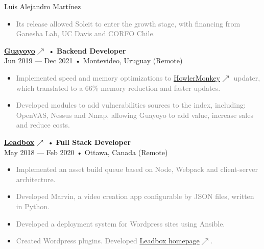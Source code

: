 \documentclass[12pt]{article}
\begin{document}
\begin{cv}{Luis Alejandro Mart\'inez}
\begin{minipage}[t]{0.55\textwidth}
{{\begin{itemize}
          \item \textcolor{gray}{Its release allowed Soleit to enter the growth stage, with financing from Ganesha Lab, UC Davis and CORFO Chile.}
        \end{itemize}
      }
    }\vspace{0.125em}
    \parbox[t]{\linewidth}{
      \textbf{\href{https://guayoyo.io}{Guayoyo\footnotesize{$\nearrow$}}} • \textrm{\textbf{Backend Developer}}\\
      Jun 2019 --- Dec 2021 • Montevideo, Uruguay (Remote)\\
      \footnotesize{
        \vspace{-\topsep}
        \vspace{-\topsep}
        \begin{itemize}
          \setlength{\parskip}{0pt}
          \setlength{\itemsep}{0pt}
          \item \textcolor{gray}{Implemented speed and memory optimizations to \href{https://howlermonkey.io}{HowlerMonkey\footnotesize{$\nearrow$}} updater, which translated to a 66\% memory reduction and faster updates.}
          \item \textcolor{gray}{Developed modules to add vulnerabilities sources to the index, including: OpenVAS, Nessus and Nmap, allowing Guayoyo to add value, increase sales and reduce costs.}
        \end{itemize}
      }
    }\vspace{0.125em}
    \parbox[t]{\linewidth}{
      \textbf{\href{https://leadboxhq.com}{Leadbox\footnotesize{$\nearrow$}}} • \textrm{\textbf{Full Stack Developer}}\\
      May 2018 --- Feb 2020 • Ottawa, Canada (Remote)\\
      \footnotesize{
        \vspace{-\topsep}
        \vspace{-\topsep}
        \begin{itemize}
          \setlength{\parskip}{0pt}
          \setlength{\itemsep}{0pt}
          \item \textcolor{gray}{Implemented an asset build queue based on Node, Webpack and client-server architecture.}
          \item \textcolor{gray}{Developed Marvin, a video creation app configurable by JSON files, written in Python.}
          \item \textcolor{gray}{Developed a deployment system for Wordpress sites using Ansible.}
          \item \textcolor{gray}{Created Wordpress plugins. Developed \href{https://leadboxhq.com}{Leadbox homepage\footnotesize{$\nearrow$}}.}
        \end{itemize}
      }
    }
  \end{minipage}

\end{cv}
\end{document}
